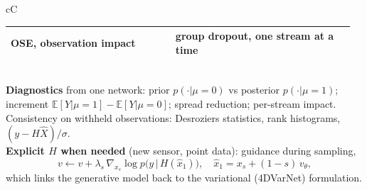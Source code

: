 \documentclass[10pt]{article}
\begin{document}
\begin{bsec}{cC}
\begin{minipage}[t]{0.47\linewidth}
\begin{tabular}[t]{@{}p{0.46\linewidth}p{0.50\linewidth}@{}}
OSE, observation impact & group dropout, one stream at a time\\ \hline
\end{tabular}\\[4pt]
\textbf{Diagnostics} from one network: prior $p(\cdot|\mu{=}0)$ vs posterior $p(\cdot|\mu{=}1)$; increment $\mathbb E[Y|\mu{=}1]-\mathbb E[Y|\mu{=}0]$; spread reduction; per-stream impact. Consistency on withheld observations: Desroziers statistics, rank histograms, $(y-H\hat X)/\sigma$.\\[4pt]
\textbf{Explicit $H$ when needed} (new sensor, point data): guidance during sampling,
\[
v\leftarrow v+\lambda_s\,\nabla_{x_s}\log p\bigl(y\,|\,H(\hat x_1)\bigr),\quad \hat x_1=x_s+(1-s)\,v_\theta ,
\]
which links the generative model back to the variational (4DVarNet) formulation.
\end{minipage}
\end{bsec}
\end{document}

